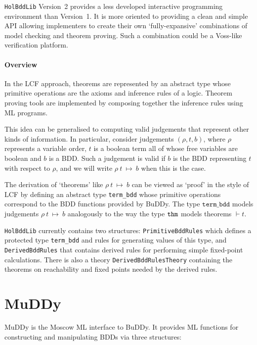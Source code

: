 \documentclass[12pt]{article}
\renewcommand{\t}[1]{\mbox{\tt #1}}
\newcommand{\ty}[1]{\mbox{\tt #1}}
\newcommand{\termbdd}[3]{\mbox{$#1~#2~\mapsto~#3$}}
\newcommand\termbddty{\texttt{term\_bdd}\xspace}
\newcommand{\Buddy}{BuDDy\xspace}
\newcommand{\Muddy}{MuDDy\xspace}
\begin{document}
{\tt{HolBddLib}} Version~2 provides a less developed interactive
programming environment than Version~1. It is more oriented to
providing a clean and simple API allowing implementers to create their
own `fully-expansive' combinations of model checking and theorem
proving. Such a combination could be a Voss-like verification
platform.

\subsection*{Overview}


In the LCF approach, theorems are represented by an abstract type
whose primitive operations are the axioms and inference rules of a
logic.  Theorem proving tools are implemented by composing together
the inference rules using ML programs.

This idea can be generalised to computing valid judgements that
represent other kinds of information. In particular, 
consider judgements $(\rho,t,b)$, where $\rho$ represents a variable order, $t$ is a boolean term
all of whose free variables are boolean and $b$ is a BDD. Such a judgement
is valid if $b$ is the BDD representing $t$ with respect to $\rho$,
and we will write \termbdd{\rho}{t}{b} when this is the case.

The derivation of `theorems' like \termbdd{\rho}{t}{b} can be viewed
as `proof' in the style of LCF by defining an abstract type \termbddty{}
whose primitive operations correspond to the BDD functions provided by \Buddy.
The type $\termbddty$ models judgements $\termbdd{\rho}{t}{b}$ analogously
to the way the type $\ty{thm}$ models theorems $\vdash t$.

\t{HolBddLib} currently contains two structures: \t{PrimitiveBddRules}
which defines a protected type \termbddty and rules for generating
values of this type, and \t{DerivedBddRules} that contains derived
rules for performing simple fixed-point calculations.  There is also a
theory \t{DerivedBddRulesTheory} containing the theorems on
reachability and fixed points needed by the derived rules.

\newpage
\tableofcontents

\newpage

\part{\Muddy}\label{muddy}

\Muddy is the Moscow
ML interface to \Buddy. It provides ML functions for constructing and
manipulating BDDs via three structures:
\end{document}
